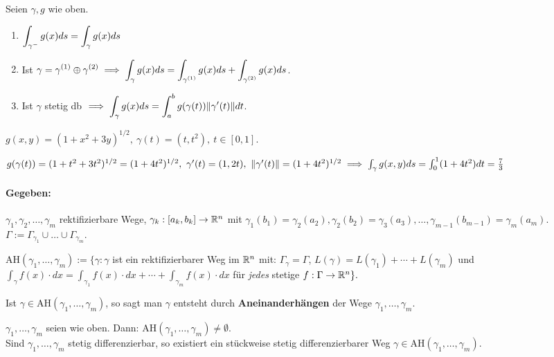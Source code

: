 \documentclass[a4paper,oneside,DIV15,BCOR12mm,chapterprefix=true,headings=onelinechapter]{scrbook}
\begin{document}
\begin{satz}
Seien $\gamma,g$ wie oben.
\begin{enumerate}
\item $\displaystyle{\int_{\gamma^-} g(x) ds = \int_\gamma g(x) ds}$
\item Ist $\displaystyle{\gamma = \gamma^{(1)} \oplus \gamma^{(2)} \ensuremath{\implies}\int_\gamma g(x)ds = \int_{\gamma^{(1)}} g(x)ds + \int_{\gamma^{(2)}} g(x)ds}$.
\item Ist $\gamma$ stetig db $\implies \displaystyle{\int_\gamma g(x)ds = \int_a^b g(\gamma(t))\|\gamma'(t)\|dt}$.
\end{enumerate}
\end{satz}

\begin{beispiel}
$g(x,y) = (1+x^2+3y)^{1/2},\ \gamma(t) = (t,t^2),\ t\in[0,1].$

$g(\gamma(t)) = (1+t^2+3t^2)^{1/2} = (1+4t^2)^{1/2},\ \gamma'(t) = (1, 2t),\ \|\gamma'(t)\| = (1+4t^2)^{1/2} \implies \int_\gamma g(x,y)ds = \int_0^1 (1+4t^2) dt = \frac{7}{3}$
\end{beispiel}

\paragraph{Gegeben:} $\gamma_1,\gamma_2,\ldots,\gamma_m$ rektifizierbare Wege, $\gamma_k:[a_k,b_k]\to\mathbb{R}^n$ mit $\gamma_1(b_1) = \gamma_2(a_2), \gamma_2(b_2) = \gamma_3(a_3),\ldots , \gamma_{m-1}(b_{m-1}) = \gamma_m(a_m)$. $\Gamma := \Gamma_{\gamma_1} \cup \ldots \cup \Gamma_{\gamma_m}$.

$\text{AH}(\gamma_1,\ldots,\gamma_m) := \{\gamma:\gamma$ ist ein rektifizierbarer Weg im $\mathbb{R}^n$ mit: $\Gamma_\gamma=\Gamma$, $L(\gamma)=L(\gamma_1)+\cdots+L(\gamma_m)$ und $\int_\gamma f(x)\cdot dx = \int_{\gamma_1}f(x)\cdot dx+ \cdots + \int_{\gamma_m}f(x)\cdot dx$ für \emph{jedes} stetige $f:\Gamma\to\mathbb{R}^n\}.$

Ist $\gamma\in \text{AH}(\gamma_1,\ldots,\gamma_m)$, so sagt man $\gamma$ entsteht durch \textbf{Aneinanderhängen} der Wege $\gamma_1,\ldots,\gamma_m$.

\begin{satz}
$\gamma_1,\ldots,\gamma_m$ seien wie oben. Dann: $\text{AH}(\gamma_1,\ldots,\gamma_m) \ne \emptyset$. \\
Sind $\gamma_1,\ldots,\gamma_m$ stetig differenzierbar, so existiert ein stückweise stetig differenzierbarer Weg $\gamma\in \text{AH}(\gamma_1,\ldots,\gamma_m)$.
\end{satz}
\end{document}
